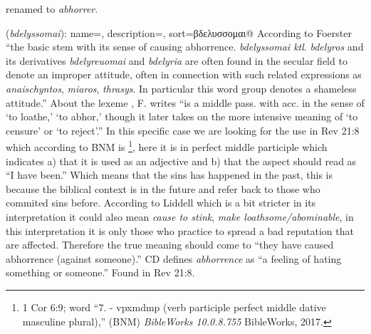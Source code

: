 \item[\sout{Abominable},] renamed to \emph{abhorrer}.
\item[Abhorrer,]

(\textit{bdelyssomai}):
{
    name=,
    description={},
    sort=βδελυσσομαι@
}
According to Foerster ``the basic stem with its sense of causing abhorrence. \emph{bdelyssomai ktl}. \emph{bdelyros} and its derivatives
\emph{bdelyreuomai} and \emph{bdelyria} are often found in the secular field to denote an improper attitude, often in connection with such related expressions
as \emph{anaischyntos}, \emph{miaros}, \emph{thrasys}. In particular this word group denotes a shameless attitude.''
About the lexeme , F. writes ``is a middle pass. with acc. in the sense of `to loathe,' `to abhor,' though it later takes on the more intensive
meaning of `to censure' or `to reject'.''
In this specific case we are looking for the use in Rev 21:8 which according to BNM is \footnote{1 Cor 6:9; word ``7.  -
vpxmdmp (verb participle perfect middle dative masculine plural),'' (BNM) \emph{BibleWorks 10.0.8.755} BibleWorks, 2017.},
here it is in perfect middle participle which indicates a) that it is used as an adjective and b) that the aspect should read as ``I have been.'' Which means that the sins has happened
in the past, this is because the biblical context is in the future and refer back to those who commited sins before. According to Liddell which is a bit stricter in its interpretation
it could also mean \emph{cause to stink}, \emph{make loathsome/abominable}, in this interpretation it is only those who practice to spread a bad reputation that are affected.
Therefore the true meaning should come to ``they have caused abhorrence (against someone).'' CD defines \emph{abhorrence} as ``a feeling of hating something or someone.''
Found in Rev 21:8.